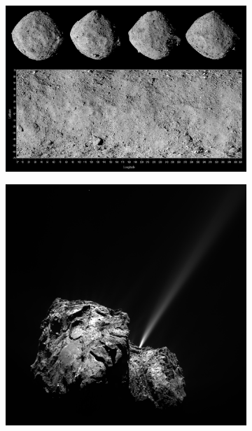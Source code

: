 \begin{figure}[htb]
    \centering
    \begin{subfigure}[b]{0.59\textwidth}
        \centering
        \includegraphics[width=\textwidth]{doc/thesis/0_figures/procedural_terrain/2963_Bennu.png}
        \caption{}
        \label{fig:render_quali_bennu}
    \end{subfigure} %
    \begin{subfigure}[b]{0.4\textwidth}
        \centering
        \includegraphics[width=\textwidth]{doc/thesis/0_figures/procedural_terrain/67P_CG.PNG}

\end{subfigure}
\end{figure}
